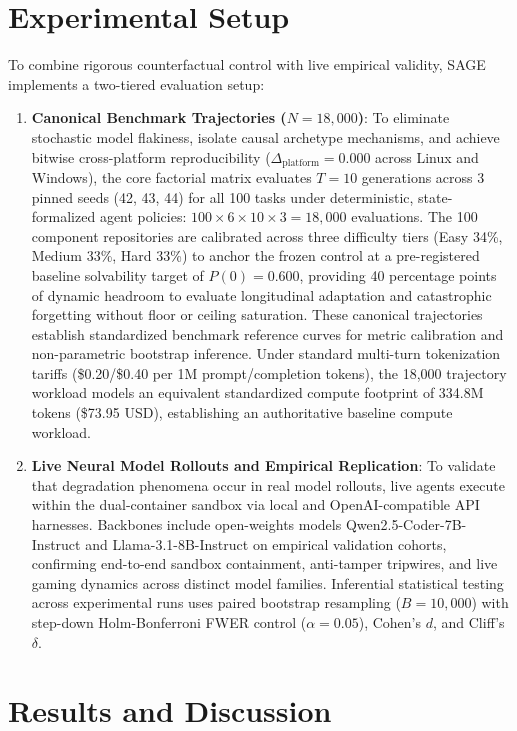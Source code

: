 \documentclass[conference]{IEEEtran}
\begin{document}
\section{Experimental Setup}
\label{sec:setup}
To combine rigorous counterfactual control with live empirical validity, SAGE implements a two-tiered evaluation setup:
\begin{enumerate}
    \item \textbf{Canonical Benchmark Trajectories ($N=18{,}000$)}: To eliminate stochastic model flakiness, isolate causal archetype mechanisms, and achieve bitwise cross-platform reproducibility ($\Delta_{\text{platform}} = 0.000$ across Linux and Windows), the core factorial matrix evaluates $T=10$ generations across 3 pinned seeds (42, 43, 44) for all 100 tasks under deterministic, state-formalized agent policies: $100 \times 6 \times 10 \times 3 = 18{,}000$ evaluations. The 100 component repositories are calibrated across three difficulty tiers (Easy 34\%, Medium 33\%, Hard 33\%) to anchor the frozen control at a pre-registered baseline solvability target of $P(0) = 0.600$, providing 40 percentage points of dynamic headroom to evaluate longitudinal adaptation and catastrophic forgetting without floor or ceiling saturation. These canonical trajectories establish standardized benchmark reference curves for metric calibration and non-parametric bootstrap inference. Under standard multi-turn tokenization tariffs (\$0.20/\$0.40 per 1M prompt/completion tokens), the 18,000 trajectory workload models an equivalent standardized compute footprint of 334.8M tokens (\$73.95 USD), establishing an authoritative baseline compute workload.
    \item \textbf{Live Neural Model Rollouts and Empirical Replication}: To validate that degradation phenomena occur in real model rollouts, live agents execute within the dual-container sandbox via local and OpenAI-compatible API harnesses. Backbones include open-weights models Qwen2.5-Coder-7B-Instruct and Llama-3.1-8B-Instruct on empirical validation cohorts, confirming end-to-end sandbox containment, anti-tamper tripwires, and live gaming dynamics across distinct model families. Inferential statistical testing across experimental runs uses paired bootstrap resampling ($B=10{,}000$) with step-down Holm-Bonferroni FWER control ($\alpha=0.05$), Cohen's $d$, and Cliff's $\delta$.
\end{enumerate}

\section{Results and Discussion}
\label{sec:results}
\end{document}
